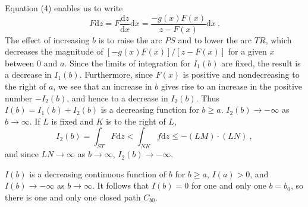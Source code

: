 \documentclass[12pt,a4paper]{article}
\newcommand{\dif}{\mathrm{d}}
\begin{document}
Equation (4) enables us to write
\begin{equation*}
F \dif z = F \dfrac{\dif z}{\dif x} \dif x = \dfrac{-g(x) F(x)}{z -F(x)} \dif x ~.
\end{equation*}
The effect of increasing $b$ is to raise the arc $PS$ and to lower the arc $TR$, which decreases the magnitude of $[-g(x)F(x)]/[z - F(x)]$ for a given $x$ between $0$ and $a$. Since the limits of integration for $I_1(b)$ are fixed, the result is a decrease in $I_1(b)$. Furthermore, since $F(x)$ is positive and nondecreasing to the right of $a$, we see
that an increase in $b$ gives rise to an increase in the positive number $-I_2(b)$, and hence to a decrease in $I_2(b)$. Thus $I(b)=I_1(b)+I_2(b)$ is a decreasing function for $b \geqslant a$. $I_2(b) \rightarrow -\infty$ as $b \rightarrow \infty$. If $L$ is fixed and $K$ is to the right of $L$, 
\begin{equation}
I_2(b) = \int_{ST} F\dif z < \int_{NK} f \dif z \leqslant -(LM) \cdot (LN) ~,
\end{equation}
and since $LN  \rightarrow \infty$ as $b  \rightarrow \infty$, $I_2(b)  \rightarrow -\infty$.

$I(b)$ is a decreasing continuous function of $b$ for $b \geqslant a$, $I(a) > 0$, and $I(b) \rightarrow -\infty$ as $b \rightarrow \infty$. It follows that $I(b)=0$ for one and only one $b= b_0$, so there is one and only one closed path $C_{b0}$.
\end{document}
